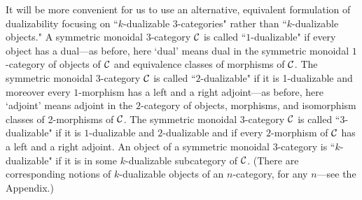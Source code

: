 \documentclass{amsart}
\begin{document}
It will be more convenient for us to use an alternative, equivalent formulation of dualizability focusing on ``$k$-dualizable $3$-categories" rather than ``$k$-dualizable objects."  A symmetric monoidal $3$-category $\mathcal C$ is called ``$1$-dualizable" if every object has a dual---as before, here `dual' means dual in the symmetric monoidal $1$-category of objects of $\mathcal C$ and equivalence classes of morphisms of $\mathcal C$.  The symmetric monoidal $3$-category $\mathcal C$ is called ``$2$-dualizable" if it is 1-dualizable and moreover every $1$-morphism has a left and a right adjoint---as before, here `adjoint' means adjoint in the $2$-category of objects, morphisms, and isomorphism classes of 2-morphisms of $\mathcal C$.  The symmetric monoidal $3$-category $\mathcal C$ is called ``$3$-dualizable" if it is $1$-dualizable and $2$-dualizable and if every $2$-morphism of $\mathcal C$ has a left and a right adjoint.  An object of a symmetric monoidal $3$-category is ``$k$-dualizable" if it is in some $k$-dualizable subcategory of $\mathcal C$.  (There are corresponding notions of $k$-dualizable objects of an $n$-category, for any $n$---see the Appendix.)

\end{document}
